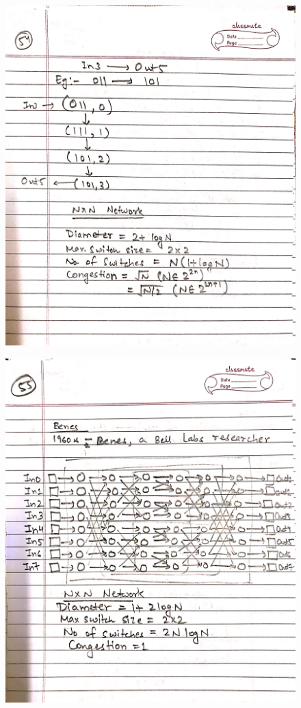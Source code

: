 \begin{figure}[H]
    \centering
    \includegraphics[scale=0.25]{"./MIT 6.042J/MIT_6042J_054"}
\end{figure}
\newpage
\begin{figure}[H]
    \centering
    \includegraphics[scale=0.25]{"./MIT 6.042J/MIT_6042J_055"}
\end{figure}
